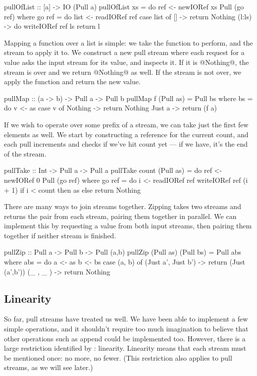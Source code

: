 \begin{code}
pullOfList :: [a] -> IO (Pull a)
pullOfList xs = do
  ref <- newIORef xs 
  Pull (go ref)
 where
  go ref = do
    list <- readIORef ref
    case list of
     []     -> return Nothing
     (l:ls) -> do
      writeIORef ref ls
      return l
\end{code}

Mapping a function over a list is simple: we take the function to perform, and the stream to apply it to.
We construct a new pull stream where each request for a value asks the input stream for its value, and inspects it.
If it is @Nothing@, the stream is over and we return @Nothing@ as well. If the stream is not over, we apply the function and return the new value.

\begin{code}
pullMap :: (a -> b) -> Pull a -> Pull b
pullMap f (Pull as) = Pull bs
 where
  bs = do
   v <- as
   case v of
    Nothing -> return Nothing
    Just a  -> return (f a)
\end{code}

If we wish to operate over some prefix of a stream, we can take just the first few elements as well. We start by constructing a reference for the current count, and each pull increments and checks if we've hit count yet --- if we have, it's the end of the stream.

\begin{code}
pullTake :: Int -> Pull a -> Pull a
pullTake count (Pull as) = do
  ref <- newIORef 0 
  Pull (go ref)
 where
  go ref = do
    i <- readIORef ref
    writeIORef ref (i + 1)
    if i < count
      then as
      else return Nothing
\end{code}

There are many ways to join streams together. Zipping takes two streams and returns the pair from each stream, pairing them together in parallel.
We can implement this by requesting a value from both input streams, then pairing them together if neither stream is finished.

\begin{code}
pullZip :: Pull a -> Pull b -> Pull (a,b)
pullZip (Pull as) (Pull bs) = Pull abs
 where
  abs = do
   a <- as
   b <- bs
   case (a, b) of
    (Just a', Just b') -> return (Just (a',b'))
    (_      , _      ) -> return  Nothing
\end{code}


\subsection{Linearity}
So far, pull streams have treated us well. We have been able to implement a few simple operations, and it shouldn't require too much imagination to believe that other operations such as append could be implemented too.
However, there is a large restriction identified by \citet{bernardy2015duality}: linearity.
Linearity means that each stream must be mentioned once: no more, no fewer.
(This restriction also applies to pull streams, as we will see later.)


